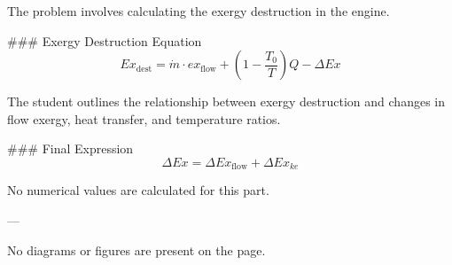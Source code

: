 The problem involves calculating the exergy destruction in the engine.  

### Exergy Destruction Equation  
\[
Ex_{\text{dest}} = \dot{m} \cdot ex_{\text{flow}} + \left( 1 - \frac{T_0}{T} \right) Q - \Delta Ex
\]  

The student outlines the relationship between exergy destruction and changes in flow exergy, heat transfer, and temperature ratios.  

### Final Expression  
\[
\Delta Ex = \Delta Ex_{\text{flow}} + \Delta Ex_{ke}
\]  

No numerical values are calculated for this part.  

---

No diagrams or figures are present on the page.